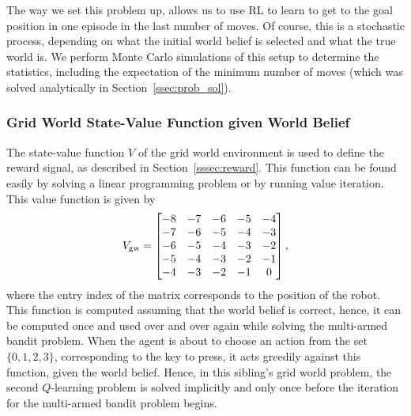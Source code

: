The way we set this problem up, allows us to use RL to learn to get to the goal
position in one episode in the last number of moves. Of course, this is a
stochastic process, depending on what the initial world belief is selected and
what the true world is. We perform Monte Carlo simulations of this setup to determine the statistics, including the expectation of the minimum number of 
moves (which was solved analytically in Section~\ref{ssec:prob_sol}).


\subsubsection{Grid World State-Value Function given World Belief}
%
The state-value function $V$ of the grid world environment is used to define the
reward signal, as described in Section~\ref{sssec:reward}. This function can be
found easily by solving a linear programming problem or by running value
iteration. This value function is given by 
%
\[
V_{\text{gw}} = \begin{bmatrix}
    -8 & -7 & -6 & -5 & -4 \\
    -7 & -6 & -5 & -4 & -3 \\
    -6 & -5 & -4 & -3 & -2 \\
    -5 & -4 & -3 & -2 & -1 \\
    -4 & -3 & -2 & -1 &  0    
\end{bmatrix},
\]
%
where the entry index of the matrix corresponds to the position of the robot.
This function is computed assuming that the world belief is correct, hence, it
can be computed once and used over and over again while solving the multi-armed
bandit problem. When the agent is about to choose an action from the set $\{0,
1, 2, 3\}$, corresponding to the key to press, it acts greedily against this
function, given the world belief. Hence, in this sibling's grid world problem, 
the second $Q$-learning problem is solved implicitly and only once before the 
iteration for the multi-armed bandit problem begins.